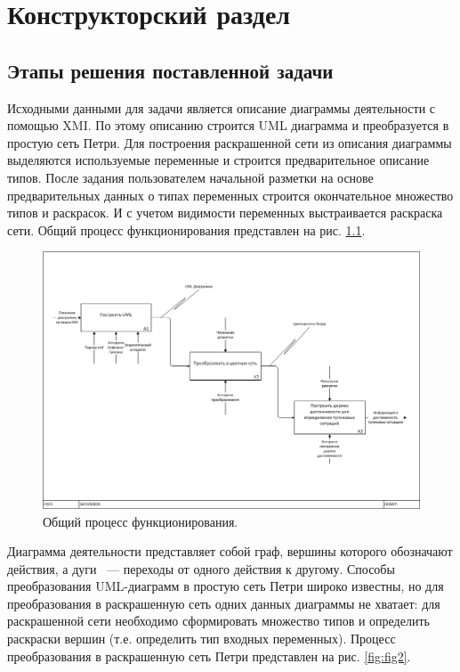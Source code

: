 \chapter{Конструкторский раздел}

\section{Этапы решения поставленной задачи}

Исходными данными для задачи является описание диаграммы деятельности с помощью XMI. По этому описанию строится UML диаграмма и преобразуется в простую сеть Петри. Для построения раскрашенной сети из описания диаграммы выделяются используемые переменные и строится предварительное описание типов. После задания пользователем начальной разметки на основе предварительных данных о типах переменных строится окончательное множество типов и раскрасок. И с учетом видимости переменных выстраивается раскраска сети. Общий процесс функционирования представлен на рис. \ref{fig:fig1}. 

\begin{figure}
	\begin{center}
		\includegraphics[width=\textwidth]{include/IDEF0.png}
	\end{center}
	\caption{Общий процесс функционирования.}
	\label{fig:fig1}
\end{figure}

Диаграмма деятельности представляет собой граф, вершины которого обозначают действия, а дуги ~--- переходы от одного действия к другому. Способы преобразования UML-диаграмм в простую сеть Петри широко известны, но для преобразования в раскрашенную сеть одних данных диаграммы не хватает: для раскрашенной сети необходимо сформировать множество типов и определить раскраски вершин (т.е. определить тип входных переменных). Процесс преобразования в раскрашенную сеть Петри представлен на рис. \ref{fig:fig2}.

